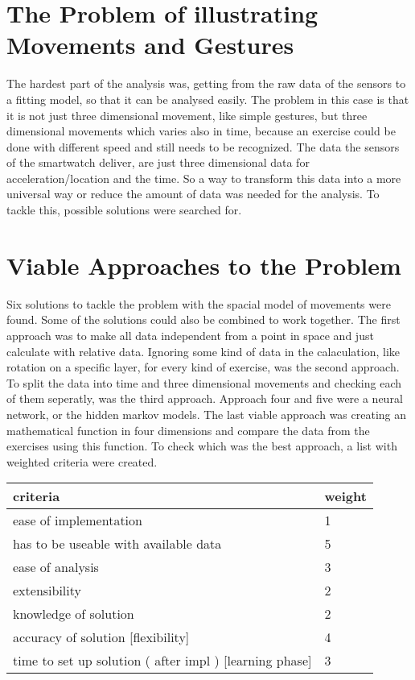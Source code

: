 
\section{The Problem of illustrating Movements and Gestures}

The hardest part of the analysis was, getting from the raw data of the sensors to a fitting model, so that it can be analysed easily. The problem in this case is that it is not just three 	dimensional movement, like simple gestures, but three dimensional movements which varies also in time, because an exercise could be done with different speed and still needs to be recognized. The data the sensors of the smartwatch deliver, are just three dimensional data for acceleration/location and the time. So a way to transform this data into a more universal way or reduce the amount of data was needed for the analysis. To tackle this, possible solutions were searched for.

\section{Viable Approaches to the Problem}

Six solutions to tackle the problem with the spacial model of movements were found. Some of the solutions could also be combined to work together. The first approach was to make all data independent from a point in space and just calculate with relative data. Ignoring some kind of data in the calaculation, like rotation on a specific layer, for every kind of exercise, was the second approach. To split the data into time and three dimensional movements and checking each of them seperatly, was the third approach. Approach four and five were a neural network, or the hidden markov models. The last viable approach was creating an mathematical function in four dimensions and compare the data from the exercises using this function.
\newline
\newline
To check which was the best approach, a list with weighted criteria were created.

\begin{table}[h]
\begin{tabular}{|l|l|}
\hline
	\textbf{criteria} & \textbf{weight} \\
\hline
	ease of implementation & 1\\
\hline
	has to be useable with available data & 5\\
\hline
	ease of analysis & 3\\
\hline
	extensibility & 2\\
\hline
	knowledge of solution & 2\\
\hline
	accuracy of solution [flexibility] & 4\\
\hline
	time to set up solution ( after impl )
[learning phase] & 3\\
\hline

\end{tabular}

\end{table}


